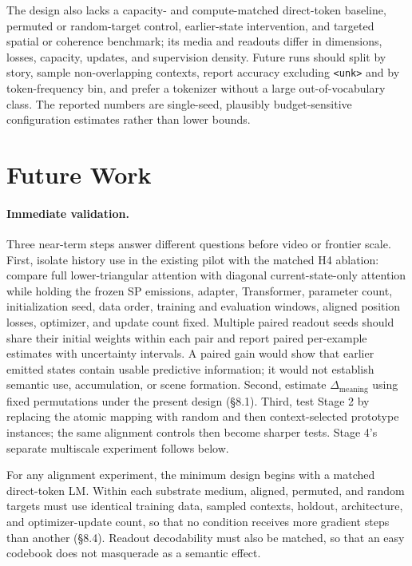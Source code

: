 \documentclass[11pt,a4paper]{article}
\begin{document}
The design also lacks a capacity- and compute-matched direct-token baseline, permuted or random-target control, earlier-state intervention, and targeted spatial or coherence benchmark; its media and readouts differ in dimensions, losses, capacity, updates, and supervision density. Future runs should split by story, sample non-overlapping contexts, report accuracy excluding \texttt{<unk>} and by token-frequency bin, and prefer a tokenizer without a large out-of-vocabulary class. The reported numbers are single-seed, plausibly budget-sensitive configuration estimates rather than lower bounds.

\section{Future Work}

\paragraph{Immediate validation.} Three near-term steps answer different questions before video or frontier scale. First, isolate history use in the existing pilot with the matched H4 ablation: compare full lower-triangular attention with diagonal current-state-only attention while holding the frozen SP emissions, adapter, Transformer, parameter count, initialization seed, data order, training and evaluation windows, aligned position losses, optimizer, and update count fixed. Multiple paired readout seeds should share their initial weights within each pair and report paired per-example estimates with uncertainty intervals. A paired gain would show that earlier emitted states contain usable predictive information; it would not establish semantic use, accumulation, or scene formation. Second, estimate $\Delta_{\mathrm{meaning}}$ using fixed permutations under the present design (§8.1). Third, test Stage 2 by replacing the atomic mapping with random and then context-selected prototype instances; the same alignment controls then become sharper tests. Stage 4's separate multiscale experiment follows below.

For any alignment experiment, the minimum design begins with a matched direct-token LM. Within each substrate medium, aligned, permuted, and random targets must use identical training data, sampled contexts, holdout, architecture, and optimizer-update count, so that no condition receives more gradient steps than another (§8.4). Readout decodability must also be matched, so that an easy codebook does not masquerade as a semantic effect.
\end{document}
